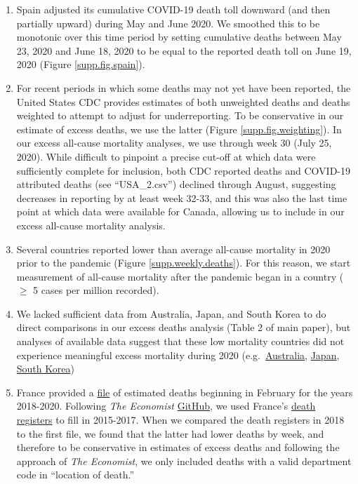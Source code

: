\documentclass[
]{article}
\providecommand{\tightlist}{%
  \setlength{\itemsep}{0pt}\setlength{\parskip}{0pt}}
\begin{document}
\begin{enumerate}
\def\labelenumi{\arabic{enumi}.}
\tightlist
\item
  Spain adjusted its cumulative COVID-19 death toll downward (and then
  partially upward) during May and June 2020. We smoothed this to be
  monotonic over this time period by setting cumulative deaths between
  May 23, 2020 and June 18, 2020 to be equal to the reported death toll
  on June 19, 2020 (Figure \ref{supp.fig.spain}).
\item
  For recent periods in which some deaths may not yet have been
  reported, the United States CDC provides estimates of both unweighted
  deaths and deaths weighted to attempt to adjust for underreporting. To
  be conservative in our estimate of excess deaths, we use the latter
  (Figure \ref{supp.fig.weighting}). In our excess all-cause mortality
  analyses, we use through week 30 (July 25, 2020). While difficult to
  pinpoint a precise cut-off at which data were sufficiently complete
  for inclusion, both CDC reported deaths and COVID-19 attributed deaths
  (see ``USA\_2.csv'') declined through August, suggesting decreases in
  reporting by at least week 32-33, and this was also the last time
  point at which data were available for Canada, allowing us to include
  in our excess all-cause mortality analysis.
\item
  Several countries reported lower than average all-cause mortality in
  2020 prior to the pandemic (Figure \ref{supp.weekly.deaths}). For this
  reason, we start measurement of all-cause mortality after the pandemic
  began in a country (\(\geq\) 5 cases per million recorded).
\item
  We lacked sufficient data from Australia, Japan, and South Korea to do
  direct comparisons in our excess deaths analysis (Table 2 of main
  paper), but analyses of available data suggest that these low
  mortality countries did not experience meaningful excess mortality
  during 2020
  (e.g.~\href{https://www.abc.net.au/news/2020-06-23/coronavirus-australia-excess-deaths-data-analysis/12321162}{Australia},
  \href{https://www.bloomberg.com/news/articles/2020-07-29/japan-dodged-surge-in-total-fatalities-during-peak-virus-month}{Japan},
  \href{https://www.nytimes.com/interactive/2020/04/21/world/coronavirus-missing-deaths.html}{South Korea})
\item
  France provided a
  \href{https://www.insee.fr/fr/statistiques/4487988?sommaire=4487854}{file}
  of estimated deaths beginning in February for the years 2018-2020.
  Following \emph{The Economist}
  \href{https://github.com/TheEconomist/covid-19-excess-deaths-tracker}{GitHub},
  we used France's
  \href{https://www.insee.fr/fr/information/4190491}{death registers} to
  fill in 2015-2017. When we compared the death registers in 2018 to the
  first file, we found that the latter had lower deaths by week, and
  therefore to be conservative in estimates of excess deaths and
  following the approach of \emph{The Economist}, we only included
  deaths with a valid department code in ``location of death.''
\end{enumerate}
\end{document}
